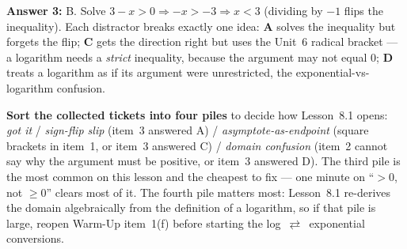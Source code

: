 \documentclass[10pt]{article}
\begin{document}
\begin{teachernote}
\textbf{Answer 3:} B. Solve $3-x>0 \Rightarrow -x>-3 \Rightarrow x<3$ (dividing by $-1$ flips the
inequality). Each distractor breaks exactly one idea: \textbf{A} solves the inequality but forgets
the flip; \textbf{C} gets the direction right but uses the Unit~6 radical bracket --- a logarithm
needs a \emph{strict} inequality, because the argument may not equal $0$; \textbf{D} treats a
logarithm as if its argument were unrestricted, the exponential-vs-logarithm confusion.

\textbf{Sort the collected tickets into four piles} to decide how Lesson~8.1 opens:
\emph{got it} / \emph{sign-flip slip} (item~3 answered A) / \emph{asymptote-as-endpoint} (square
brackets in item~1, or item~3 answered C) / \emph{domain confusion} (item~2 cannot say why the
argument must be positive, or item~3 answered D). The third pile is the most common on this lesson
and the cheapest to fix --- one minute on ``$>0$, not $\ge 0$'' clears most of it. The fourth pile
matters most: Lesson~8.1 re-derives the domain algebraically from the definition of a logarithm, so
if that pile is large, reopen Warm-Up item~1(f) before starting the log~$\rightleftarrows$~exponential
conversions.
\end{teachernote}
\end{document}
